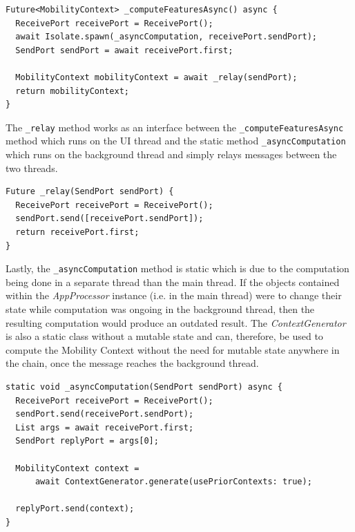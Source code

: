 \begin{verbatim}
Future<MobilityContext> _computeFeaturesAsync() async {
  ReceivePort receivePort = ReceivePort();
  await Isolate.spawn(_asyncComputation, receivePort.sendPort);
  SendPort sendPort = await receivePort.first;

  MobilityContext mobilityContext = await _relay(sendPort);
  return mobilityContext;
}
\end{verbatim}

The \verb|_relay| method works as an interface between the \verb|_computeFeaturesAsync| method which runs on the UI thread and the static method \verb|_asyncComputation| which runs on the background thread and simply relays messages between the two threads.

\begin{verbatim}
Future _relay(SendPort sendPort) {
  ReceivePort receivePort = ReceivePort();
  sendPort.send([receivePort.sendPort]);
  return receivePort.first;
}
\end{verbatim}

Lastly, the \verb|_asyncComputation| method is static which is due to the computation being done in a separate thread than the main thread. If the objects contained within the \textit{AppProcessor} instance (i.e. in the main thread) were to change their state while computation was ongoing in the background thread, then the resulting computation would produce an outdated result. The \textit{ContextGenerator} is also a static class without a mutable state and can, therefore, be used to compute the Mobility Context without the need for mutable state anywhere in the chain, once the message reaches the background thread.

\begin{verbatim}
static void _asyncComputation(SendPort sendPort) async {
  ReceivePort receivePort = ReceivePort();
  sendPort.send(receivePort.sendPort);
  List args = await receivePort.first;
  SendPort replyPort = args[0];

  MobilityContext context =
      await ContextGenerator.generate(usePriorContexts: true);

  replyPort.send(context);
}
\end{verbatim}

